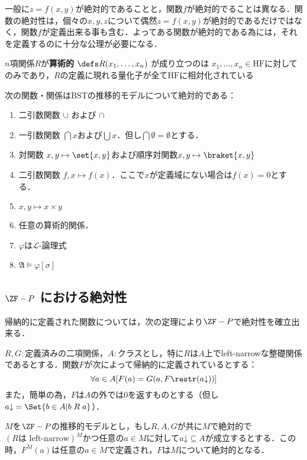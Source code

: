\documentclass[xelatex,a4j,jadriver=standard]{bxjsarticle}
\newcommand*{\BST}{\mathrm{BST}}
\newcommand*{\HF}{\mathrm{HF}}
\begin{document}
一般に$z = f(x,y)$が絶対的であることと，関数$f$が絶対的でることは異なる．関数の絶対性は，個々の$x, y, z$について偶然$z = f(x,y)$が絶対的であるだけではなく，関数$f$が定義出来る事も含む．よってある関数が絶対的である為には，それを定義するのに十分な公理が必要になる．

\begin{definition}
 $n$項関係$R$が{\bfseries 算術的} $\defs R(x_1, \dots, x_n)$ が成り立つのは $x_1, \dots, x_n \in \HF$に対してのみであり，$R$の定義に現れる量化子が全て$\HF$に相対化されている
\end{definition}

\begin{theorem}[$\BST$で絶対的な関数・関係]
 次の関数・関係は$\BST$の推移的モデルについて絶対的である：

 \begin{enumerate}
  \item 二引数関数 $\cup$ および $\cap$
  \item 一引数関数 $\bigcap x$および$\bigcup x$．但し$\bigcap \emptyset = \emptyset$とする．
  \item 対関数 $x, y \mapsto \set{x,y}$および順序対関数$x, y \mapsto \braket{x, y}$
  \item 二引数関数 $f, x \mapsto f(x)$．ここで$x$が定義域にない場合は$f(x) = 0$とする．
  \item $x, y \mapsto x \times y$
  \item 任意の算術的関係．
  \item $\varphi$は$\mathcal{L}$-論理式
  \item $\mathfrak{A} \models \varphi[\sigma]$
 \end{enumerate}
\end{theorem}

\subsection{$\ZF-P$ における絶対性}

帰納的に定義された関数については，次の定理により$\ZF-P$で絶対性を確立出来る．

\begin{theorem}[帰納的に定義され関数の絶対性]
 $R, G:$定義済みの二項関係，$A:$クラスとし，特に$R$は$A$上でleft-narrowな整礎関係であるとする．関数$F$が次によって帰納的に定義されているとする：
 \[
  \forall a \in A [F(a) = G(a, F \restr (a\mathord{\downarrow}))]
 \]
 また，簡単の為，$F$は$A$の外では$0$を返すものとする（但し$a \mathord{\downarrow} = \Set{b \in A | b \mathrel{R} a}$）．

 $M$を$\ZF-P$の推移的モデルとし，もし$R, A, G$が共に$M$で絶対的で$(R \text{は left-narrow})^M$かつ任意の$a \in M$に対して$a \mathord{\downarrow} \subseteq A$が成立するとする．この時，$F^M(a)$は任意の$a \in M$で定義され，$F$は$M$について絶対的となる．
\end{theorem}
\end{document}
